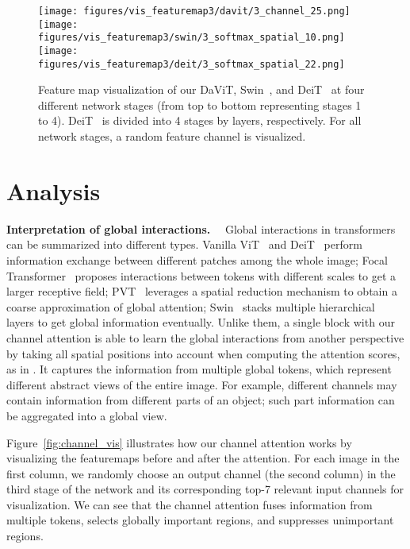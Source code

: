 \documentclass[runningheads]{llncs}
\begin{document}
\begin{figure}[t]
\texttt{[image: figures/vis\_featuremap3/davit/3\_channel\_25.png]}\hspace{-0.2pt}
\texttt{[image: figures/vis\_featuremap3/swin/3\_softmax\_spatial\_10.png]}\hspace{-0.2pt}
\texttt{[image: figures/vis\_featuremap3/deit/3\_softmax\_spatial\_22.png]}
\\
\vspace{-4pt}
\caption{Feature map visualization of our DaViT, Swin~\cite{liu2021swin}, and DeiT~\cite{touvron2021training} at four different network stages (from top to bottom representing stages 1 to 4). 
DeiT~\cite{touvron2021training} is divided into 4 stages by  layers, respectively.
For all network stages, a random feature channel is visualized.
}
\vspace{-8pt}
\label{fig:global_vis}
\end{figure}


\vspace{-4pt}
\section{Analysis}
\vspace{-4pt}
\label{sec:global_analysis}

\noindent \textbf{Interpretation of global interactions.}~~
Global interactions in transformers can be summarized into different types.
Vanilla ViT~\cite{dosovitskiy2020image} and DeiT~\cite{touvron2021training} perform information exchange between different patches among the whole image; Focal Transformer~\cite{yang2021focal} proposes interactions between tokens with different scales to get a larger receptive field; PVT~\cite{wang2021pvtv2} leverages a spatial reduction mechanism to obtain a coarse approximation of global attention; Swin~\cite{liu2021swin} stacks multiple hierarchical layers to get global information eventually.
Unlike them, a single block with our channel attention is able to learn the global interactions from another perspective by taking all spatial positions into account when computing the attention scores, as in .
It captures the information from multiple global tokens, which represent different abstract views of the entire image.
For example, different channels may contain information from different parts of an object; such part information can be aggregated into a global view.

Figure~\ref{fig:channel_vis} illustrates how our channel attention works by visualizing the featuremaps before and after the attention. For each image in the first column, we randomly choose an output channel (the second column) in the third stage of the network and its corresponding top-7 relevant input channels for visualization.
We can see that the channel attention fuses information from multiple tokens, selects globally important regions, and suppresses unimportant regions.
\end{document}
